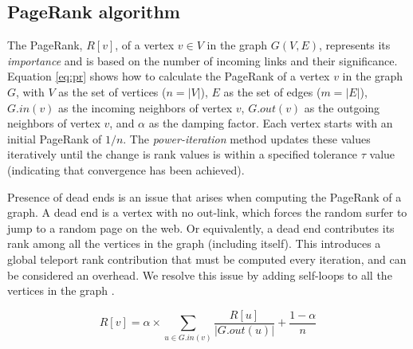 \subsection{PageRank algorithm}
\label{sec:pagerank}

The PageRank, $R[v]$, of a vertex $v \in V$ in the graph $G(V, E)$, represents its \textit{importance} and is based on the number of incoming links and their significance. Equation \ref{eq:pr} shows how to calculate the PageRank of a vertex $v$ in the graph $G$, with $V$ as the set of vertices ($n = |V|$), $E$ as the set of edges ($m = |E|$), $G.in(v)$ as the incoming neighbors of vertex $v$, $G.out(v)$ as the outgoing neighbors of vertex $v$, and $\alpha$ as the damping factor. Each vertex starts with an initial PageRank of $1/n$. The \textit{power-iteration} method updates these values iteratively until the change is rank values is within a specified tolerance $\tau$ value (indicating that convergence has been achieved).


Presence of dead ends is an issue that arises when computing the PageRank of a graph. A dead end is a vertex with no out-link, which forces the random surfer to jump to a random page on the web. Or equivalently, a dead end contributes its rank among all the vertices in the graph (including itself). This introduces a global teleport rank contribution that must be computed every iteration, and can be considered an overhead. We resolve this issue by adding self-loops to all the vertices in the graph \cite{rank-andersen07, rank-langville06}.

\begin{equation}
\label{eq:pr}
    R[v] = \alpha \times \sum_{u \in G.in(v)} \frac{R[u]}{|G.out(u)|} + \frac{1 - \alpha}{n}
\end{equation}




